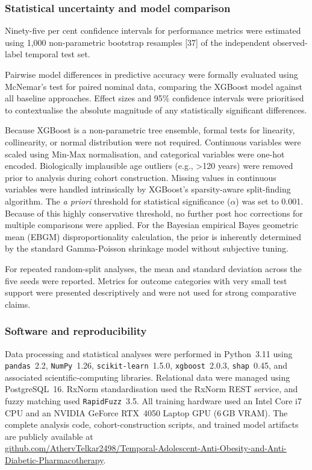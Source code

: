 \documentclass[10pt]{article}
\begin{document}
\subsubsection{Statistical uncertainty and model comparison}
Ninety-five per cent confidence intervals for performance metrics were estimated using 1,000 non-parametric bootstrap resamples [37] of the independent observed-label temporal test set.

Pairwise model differences in predictive accuracy were formally evaluated using McNemar's test for paired nominal data, comparing the XGBoost model against all baseline approaches. Effect sizes and 95\% confidence intervals were prioritised to contextualise the absolute magnitude of any statistically significant differences. 

Because XGBoost is a non-parametric tree ensemble, formal tests for linearity, collinearity, or normal distribution were not required. Continuous variables were scaled using Min-Max normalisation, and categorical variables were one-hot encoded. Biologically implausible age outliers (e.g., >120 years) were removed prior to analysis during cohort construction. Missing values in continuous variables were handled intrinsically by XGBoost's sparsity-aware split-finding algorithm. The \textit{a priori} threshold for statistical significance ($\alpha$) was set to 0.001. Because of this highly conservative threshold, no further post hoc corrections for multiple comparisons were applied. For the Bayesian empirical Bayes geometric mean (EBGM) disproportionality calculation, the prior is inherently determined by the standard Gamma-Poisson shrinkage model without subjective tuning.

For repeated random-split analyses, the mean and standard deviation across the five seeds were reported. Metrics for outcome categories with very small test support were presented descriptively and were not used for strong comparative claims.

\subsubsection{Software and reproducibility}
Data processing and statistical analyses were performed in Python~3.11 using \texttt{pandas}~2.2, \texttt{NumPy}~1.26, \texttt{scikit-learn}~1.5.0, \texttt{xgboost}~2.0.3, \texttt{shap}~0.45, and associated scientific-computing libraries. Relational data were managed using PostgreSQL~16. RxNorm standardisation used the RxNorm REST service, and fuzzy matching used \texttt{RapidFuzz}~3.5. All training hardware used an Intel Core i7 CPU and an NVIDIA GeForce RTX~4050 Laptop GPU (6\,GB VRAM). The complete analysis code, cohort-construction scripts, and trained model artifacts are publicly available at\\ \href{https://github.com/AthervTelkar2498/Temporal-Adolescent-Anti-Obesity-and-Anti-Diabetic-Pharmacotherapy}{github.com/AthervTelkar2498/Temporal-Adolescent-Anti-Obesity-and-Anti-Diabetic-Pharmacotherapy}.
\end{document}
